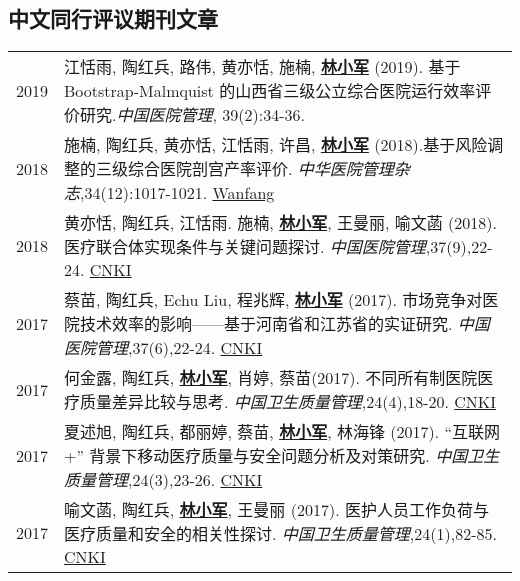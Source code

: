 \documentclass{resume}
\begin{document}
\subsection*{\textbf{中文同行评议期刊文章}}
\begin{longtable}{r p{14cm}}


2019 & 江恬雨, 陶红兵, 路伟, 黄亦恬, 施楠, \underline{\textbf{林小军}} (2019). 基于 Bootstrap-Malmquist 的山西省三级公立综合医院运行效率评价研究.\emph{中国医院管理}, 39(2):34-36.\\
2018 & 施楠, 陶红兵, 黄亦恬, 江恬雨, 许昌, \underline{\textbf{林小军}} (2018).基于风险调整的三级综合医院剖宫产率评价. \emph{中华医院管理杂志},34(12):1017-1021. \href{http://www.wanfangdata.com.cn/details/detail.do?_type=perio&id=zhyygl201812011}{Wanfang} \\
2018 & 黄亦恬, 陶红兵, 江恬雨. 施楠, \underline{\textbf{林小军}}, 王曼丽, 喻文菡 (2018). 医疗联合体实现条件与关键问题探讨. \emph{中国医院管理},37(9),22-24. \href{http://kns.cnki.net/KCMS/detail/detail.aspx?dbcode=CJFQ&dbname=CJFDLAST2018&filename=YYGL201809005&v=MjIxMjdlWnVadEZpRGxWNzNPUERUTVlyRzRIOW5NcG85RllZUjhlWDFMdXhZUzdEaDFUM3FUcldNMUZyQ1VSTEs=}{CNKI} \\
2017 & 蔡苗, 陶红兵, Echu Liu, 程兆辉, \underline{\textbf{林小军}} (2017). 市场竞争对医院技术效率的影响——基于河南省和江苏省的实证研究. \emph{中国医院管理},37(6),22-24. \href{http://kns.cnki.net/KCMS/detail/detail.aspx?dbcode=CJFQ&dbname=CJFDLAST2017&filename=YYGL201706012&v=MzEzMTREbFZMdkFQRFRNWXJHNEg5Yk1xWTlFWm9SOGVYMUx1eFlTN0RoMVQzcVRyV00xRnJDVVJMS2VadVp0Rmk=}{CNKI}\\
2017 & 何金露, 陶红兵, \underline{\textbf{林小军}}, 肖婷, 蔡苗(2017). 不同所有制医院医疗质量差异比较与思考. \emph{中国卫生质量管理},24(4),18-20. \href{http://kns.cnki.net/KCMS/detail/detail.aspx?dbcode=CJFQ&dbname=CJFDLAST2017&filename=WSJG201704010&v=MTU5NzM0OUVaSVI4ZVgxTHV4WVM3RGgxVDNxVHJXTTFGckNVUkxLZVp1WnRGaURtVTcvTU1qN0JhYkc0SDliTXE=}{CNKI}\\
2017 & 夏述旭, 陶红兵, 都丽婷, 蔡苗, \underline{\textbf{林小军}}, 林海锋 (2017). “互联网+” 背景下移动医疗质量与安全问题分析及对策研究. \emph{中国卫生质量管理},24(3),23-26. \href{http://kns.cnki.net/KCMS/detail/detail.aspx?dbcode=CJFQ&dbname=CJFDLAST2017&filename=WSJG201703030&v=MjQwMTVHWklSOGVYMUx1eFlTN0RoMVQzcVRyV00xRnJDVVJMS2VadVp0RmlEbVViL01NajdCYWJHNEg5Yk1ySTk=}{CNKI}\\
2017 & 喻文菡, 陶红兵, \underline{\textbf{林小军}}, 王曼丽 (2017). 医护人员工作负荷与医疗质量和安全的相关性探讨. \emph{中国卫生质量管理},24(1),82-85. \href{http://kns.cnki.net/KCMS/detail/detail.aspx?dbcode=CJFQ&dbname=CJFDLAST2017&filename=WSJG201701013&v=MDI5NThSOGVYMUx1eFlTN0RoMVQzcVRyV00xRnJDVVJMS2VadVp0RmlEbVY3M09NajdCYWJHNEg5Yk1ybzlFWjQ=}{CNKI}\\

\end{longtable}
\end{document}
